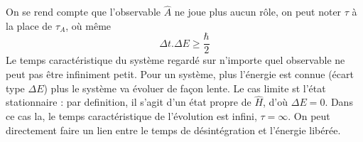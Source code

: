 On se rend compte que l'observable $\hat A$ ne joue plus aucun rôle, on peut noter $\tau$ à 
la place de $\tau_A$, où même
\begin{equation}
\Delta t.\Delta E \geq\dfrac{\hbar}{2}
\end{equation}
Le temps caractéristique du système regardé sur n'importe quel observable ne peut pas être 
infiniment petit. Pour un système, plus l'énergie est connue (écart type $\Delta E$) plus le 
système va évoluer de façon lente. Le cas limite st l'état stationnaire : par definition, il 
s'agit d'un état propre de $\hat H$, d'où $\Delta E=0$. Dans ce cas la, le temps caractéristique 
de l'évolution est infini, $\tau=\infty$. On peut directement faire un lien entre le temps de 
désintégration et l'énergie libérée.
 
 
 
 
 
 
 
 
 
 
 
 
 
 
 